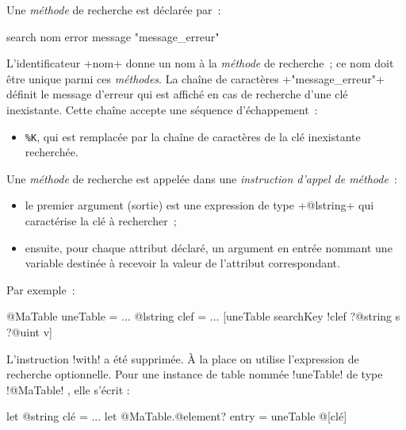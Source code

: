 Une \emph{méthode} de recherche est déclarée par~:


\begin{galgas3}
search nom error message "message_erreur"
\end{galgas3}

\begin{galgas4}
\end{galgas4}

L'identificateur \ggst+nom+ donne un nom à la \emph{méthode} de recherche~; ce nom doit être unique parmi ces \emph{méthodes}. La chaîne de caractères \ggst+"message_erreur"+ définit le message d'erreur qui est affiché en cas de recherche d'une clé inexistante. Cette chaîne accepte une séquence d'échappement~:
\begin{itemize}
  \item \texttt{\%K}, qui est remplacée par la chaîne de caractères de la clé inexistante recherchée.
\end{itemize}


Une \emph{méthode} de recherche est appelée dans une \emph{instruction d'appel de méthode}~:
\begin{itemize}
  \item le premier argument (sortie) est une expression de type \ggst+@lstring+ qui caractérise la clé à rechercher~;
  \item ensuite, pour chaque attribut déclaré, un argument en entrée nommant une variable destinée à recevoir la valeur de l'attribut correspondant.
\end{itemize}

Par exemple~:
\begin{galgas3}
@MaTable uneTable = {}
...
@lstring clef = ...
[uneTable searchKey !clef ?@string s ?@uint v]
\end{galgas3}










L'instruction \ggst!with! a été supprimée. À la place on utilise l'expression de recherche optionnelle. Pour une instance de table nommée \ggst!uneTable! de type \ggst!@MaTable! , elle s'écrit :

\begin{galgas3}
let @string clé = ...
let @MaTable.@element? entry = uneTable @[clé]
\end{galgas3}

